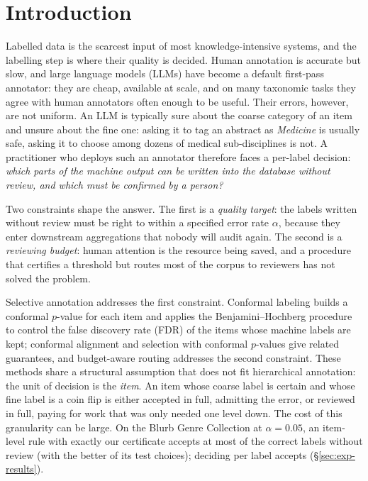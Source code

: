 \documentclass[preprint,12pt]{elsarticle}
\theoremstyle{definition}
\theoremstyle{remark}
\begin{document}
\section{Introduction}
\label{sec:intro}

Labelled data is the scarcest input of most knowledge-intensive systems, and
the labelling step is where their quality is decided. Human annotation is
accurate but slow, and large language models (LLMs) have become a default
first-pass annotator: they are cheap, available at scale, and on many taxonomic
tasks they agree with human annotators often enough to be useful. Their errors,
however, are not uniform. An LLM is typically sure about the coarse category of
an item and unsure about the fine one: asking it to tag an abstract as
\emph{Medicine} is usually safe, asking it to choose among dozens of medical
sub-disciplines is not. A practitioner who deploys such an annotator therefore
faces a per-label decision: \emph{which parts of the machine output can be
written into the database without review, and which must be confirmed by a
person?}

Two constraints shape the answer. The first is a \emph{quality target}: the
labels written without review must be right to within a specified error rate
$\alpha$, because they enter downstream aggregations that nobody will audit
again. The second is a \emph{reviewing budget}: human attention is the resource
being saved, and a procedure that certifies a threshold but routes most of the
corpus to reviewers has not solved the problem.

Selective annotation addresses the first constraint. Conformal labeling
\cite{huang2025selective} builds a conformal $p$-value for each item and applies
the Benjamini--Hochberg procedure to control the false discovery rate (FDR) of
the items whose machine labels are kept; conformal alignment
\cite{gui2024conformalalignment} and selection with conformal $p$-values
\cite{jin2023selection} give related guarantees, and budget-aware routing
\cite{jung2025trust,quorum2026} addresses the second constraint. These methods
share a structural assumption that does not fit hierarchical annotation: the
unit of decision is the \emph{item}. An item whose coarse label is certain and
whose fine label is a coin flip is either accepted in full, admitting the error,
or reviewed in full, paying for work that was only needed one level down. The
cost of this granularity can be large. On the Blurb Genre Collection at
$\alpha=0.05$, an item-level rule with exactly our certificate accepts at most
 of the correct labels without review (with the
better of its test choices); deciding per label accepts
 (\S\ref{sec:exp-results}).
\end{document}
